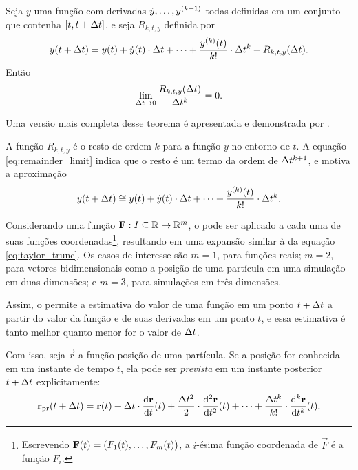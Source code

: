 \begin{theorem} \label{theo:taylor}
	Seja \(y\) uma função com derivadas \(\deriv{1}{y},\dots,y^{\pqty{k+1}}\) todas definidas em um conjunto que contenha \(\bqty{t, t+\Dt}\), e seja \(R_{k, t, y}\) definida por
    \begin{equation*}
    	y(t + \Dt) = y(t) + \deriv{1}{y}(t)\cdot\Dt + \dots + \dfrac{\deriv{k}{y}(t)}{k!}\cdot\Dt^k + R_{k, t, y}(\Dt).
    \end{equation*}
    Então
    \begin{equation} \label{eq:remainder_limit}
    	\lim_{\Delta t \rightarrow 0} \dfrac{R_{k, t, y}(\Delta t)}{\Delta t^k} = 0.
    \end{equation}
\end{theorem}

Uma versão mais completa desse teorema é apresentada e demonstrada por .

A função \(R_{k, t, y}\) é o resto de ordem \(k\) para a função \(y\) no entorno de \(t\). A equação \eqref{eq:remainder_limit} indica que o resto é um termo da ordem de \(\Delta t^{k+1}\), e motiva a aproximação
\begin{equation} \label{eq:taylor_trunc}
    y(t + \Dt) \cong y(t) + \deriv{1}{y}(t)\cdot\Dt + \dots + \dfrac{\deriv{k}{y}(t)}{k!}\cdot\Dt^k.
\end{equation}

Considerando uma função \(\mathbf{F}:I\subseteq \mathbb{R} \rightarrow \mathbb{R}^m\), o  pode ser aplicado a cada uma de suas funções coordenadas\footnote{Escrevendo \(\vec{F}(t) = \pqty{F_1(t),\dots,F_m(t)}\), a \(i\)-ésima função coordenada de \(\vec{F}\) é a função \(F_i\).}, resultando em uma expansão similar à da equação \eqref{eq:taylor_trunc}. Os casos de interesse são \(m=1\), para funções reais; \(m=2\), para vetores bidimensionais como a posição de uma partícula em uma simulação em duas dimensões; e \(m=3\), para simulações em três dimensões.

Assim, o  permite a estimativa do valor de uma função em um ponto \(t+\Delta t\) a partir do valor da função e de suas derivadas em um ponto \(t\), e essa estimativa é tanto melhor quanto menor for o valor de \(\Delta t\).

Com isso, seja \(\vec{r}\) a função posição de uma partícula. Se a posição for conhecida em um instante de tempo \(t\), ela pode ser \textit{prevista} em um instante posterior \(t+\Delta t\) explicitamente:
\begin{equation} \label{eq:position_prediction}
	\predicted{\vec{r}}\pqty{t+\Dt} = \vec{r}\pqty{t} + \Dt\cdot\dv{\vec{r}}{t}\pqty{t} + \dfrac{\Dt^2}{2}\cdot \dv[2]{\vec{r}}{t}\pqty{t} + \dots + \dfrac{\Dt^k}{k!}\cdot \dv[k]{\vec{r}}{t}\pqty{t}.
\end{equation}

